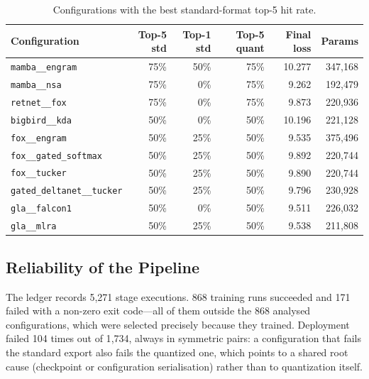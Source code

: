 \begin{table}[H]
\centering
\small
\caption{Configurations with the best standard-format top-5 hit rate.}
\label{tab:r2-inference}
\begin{tabular}{lrrrrr}
\toprule
Configuration & Top-5 std & Top-1 std & Top-5 quant & Final loss & Params \\
\midrule
\texttt{mamba\_\_engram} & 75\% & 50\% & 75\% & 10.277 & 347{,}168 \\
\texttt{mamba\_\_nsa}    & 75\% & 0\%  & 75\% & 9.262  & 192{,}479 \\
\texttt{retnet\_\_fox}  & 75\% & 0\%  & 75\% & 9.873  & 220{,}936 \\
\texttt{bigbird\_\_kda}  & 50\% & 0\%  & 50\% & 10.196 & 221{,}128 \\
\texttt{fox\_\_engram}   & 50\% & 25\% & 50\% & 9.535  & 375{,}496 \\
\texttt{fox\_\_gated\_softmax} & 50\% & 25\% & 50\% & 9.892 & 220{,}744 \\
\texttt{fox\_\_tucker}   & 50\% & 25\% & 50\% & 9.890  & 220{,}744 \\
\texttt{gated\_deltanet\_\_tucker} & 50\% & 25\% & 50\% & 9.796 & 230{,}928 \\
\texttt{gla\_\_falcon1}  & 50\% & 0\%  & 50\% & 9.511  & 226{,}032 \\
\texttt{gla\_\_mlra}     & 50\% & 25\% & 50\% & 9.538  & 211{,}808 \\
\bottomrule
\end{tabular}
\end{table}

\subsection{Reliability of the Pipeline}

The ledger records 5{,}271 stage executions. 868 training runs succeeded and 171 failed with a non-zero exit code---all of them outside the 868 analysed configurations, which were selected precisely because they trained. Deployment failed 104 times out of 1{,}734, always in symmetric pairs: a configuration that fails the standard export also fails the quantized one, which points to a shared root cause (checkpoint or configuration serialisation) rather than to quantization itself.

